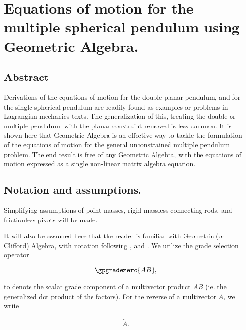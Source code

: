 

\chapter{Equations of motion for the multiple spherical pendulum using Geometric Algebra.}
\label{chap:sPolarArxiv}
\date{}

\beginArtNoToc

\section{Abstract}

Derivations of the equations of motion for the double planar pendulum, and for the single spherical pendulum are readily found as examples or problems in Lagrangian mechanics texts.  The generalization of this, treating the double or multiple pendulum, with the planar constraint removed is less common.  It is shown here that Geometric Algebra is an effective way to tackle the formulation of the equations of motion for the general unconstrained multiple pendulum problem.  The end result is free of any Geometric Algebra, with the equations of motion expressed as a single non-linear matrix algebra equation.

\section{Notation and assumptions.}

Simplifying assumptions of point masses, rigid massless connecting rods, and frictionless pivots will be made.

It will also be assumed here that the reader is familiar with Geometric (or Clifford) Algebra, with notation following \cite{hestenes1999nfc}, and \cite{doran2003gap}.  We utilize the grade selection operator

\begin{align}\label{eqn:sPolarArxiv:moo1}
\gpgradezero{A B},
\end{align}

to denote the scalar grade component of a multivector product $A B$ (ie. the generalized dot product of the factors).  For the reverse of a multivector $A$, we write

\begin{align}\label{eqn:sPolarArxiv:moo2}
\tilde{A}.
\end{align}

